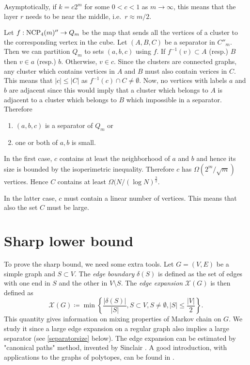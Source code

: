 Asymptotically, if $k = c2^m$ for some $0<c<1$ as $m\rightarrow \infty$, this 
means that the layer $r$ needs to be near the middle, i.e.\ $r\approx m/2$. 


Let $f: \textrm{NCP}_4(m)'' \rightarrow Q_m$ 
be the map that sends all the vertices of a cluster to the corresponding vertex 
in the cube. 
Let $(A,B,C)$ be a separator in $C''_m$. Then we can partition
$Q_m$ to sets $(a,b,c)$ using $f$. If $f^{-1}(v) \subset A$ (resp.) $B$ 
then 
$v \in a$ (resp.) $b$. Otherwise, $v \in c$. Since the clusters are connected 
graphs, any cluster which contains vertices in $A$ and $B$ must also contain 
verices in $C$. This means that $|c| \leq |C|$ as $f^{-1}(c) \cap C \neq 
\emptyset$.
Now, no vertices with labels $a$ and $b$ are adjacent since this would imply 
that a cluster which belongs to $A$ is adjacent to a cluster which belongs to 
$B$ which impossible in a separator. Therefore
\begin{enumerate}
 \item $(a,b,c)$ is a separator of $Q_m$ or
\item one or both of $a,b$ is small.
\end{enumerate}
In the first case, $c$ contains at least the neighborhood of $a$ and $b$ and 
hence its size is bounded by the isoperimetric inequality. Therefore $c$ has 
$\Omega(2^m/\sqrt{m})$ vertices. Hence $C$ contains at least $\Omega(N/(\log 
N)^{\frac{3}{2}}$.

In the latter case, $c$ must contain a linear number of vertices. This means 
that also the set $C$ must be large.  

\section{Sharp lower bound}

To prove the sharp bound, we need some extra tools. Let $G= (V,E)$ be a simple graph and
 $S\subset V$. The \textit{edge boundary} $\delta(S)$ is defined as the set of edges with one end
in $S$ and the other in $V\setminus S$. The \textit{edge expansion} $\mathcal{X}(G)$ is then defined
as 
\begin{equation}
\mathcal{X}(G) \coloneqq  \min \left\{ \frac{ |\delta(S) |}{ |S |}, S \subset V, S\neq \emptyset, |S| \leq \frac{ |V |}{2}  \right\}.
\end{equation} 
This quantity gives information on mixing properties of Markov chain on $G$. We study it since
a large edge expansion on a regular graph also implies a large separator (see \ref{separatorsize} below).
The edge expansion can be estimated by "canonical paths" method, invented by Sinclair \cite{Sinclair}. 
A good introduction, with applications to the graphs of polytopes, can be found in \cite{Kaibel}. 

